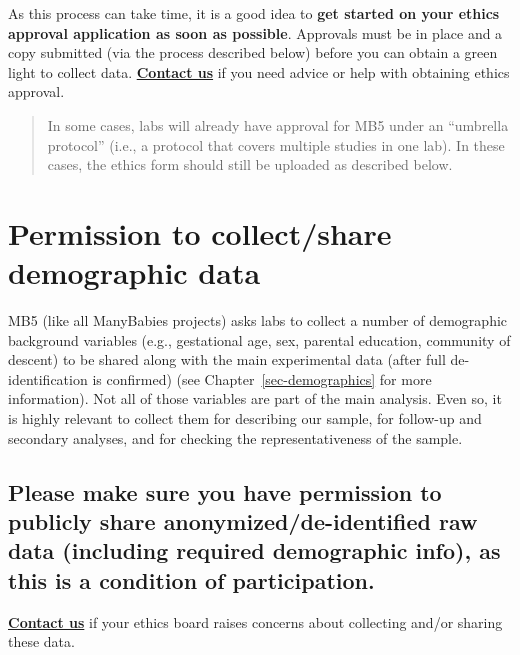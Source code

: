\documentclass[
  letterpaper,
  DIV=11,
  numbers=noendperiod,
  oneside]{scrreprt}
\begin{document}
As this process can take time, it is a good idea to \textbf{get started
on your ethics approval application as soon as possible}. Approvals must
be in place and a copy submitted (via the process described below)
before you can obtain a green light to collect data.
\href{mailto:mb5@manybabies.org}{\textbf{Contact us}} if you need advice
or help with obtaining ethics approval.

\begin{quote}
In some cases, labs will already have approval for MB5 under an
``umbrella protocol'' (i.e., a protocol that covers multiple studies in
one lab). In these cases, the ethics form should still be uploaded as
described below.
\end{quote}

\section{Permission to collect/share demographic
data}\label{permission-to-collectshare-demographic-data}

MB5 (like all ManyBabies projects) asks labs to collect a number of
demographic background variables (e.g., gestational age, sex, parental
education, community of descent) to be shared along with the main
experimental data (after full de-identification is confirmed) (see
Chapter~\ref{sec-demographics} for more information). Not all of those
variables are part of the main analysis. Even so, it is highly relevant
to collect them for describing our sample, for follow-up and secondary
analyses, and for checking the representativeness of the sample.

\subsection*{Please make sure you have permission to publicly share
anonymized/de-identified raw data (including required demographic info),
as this is a condition of
participation.}\label{please-make-sure-you-have-permission-to-publicly-share-anonymizedde-identified-raw-data-including-required-demographic-info-as-this-is-a-condition-of-participation.}

\href{mailto:mb5@manybabies.org}{\textbf{Contact us}} if your ethics
board raises concerns about collecting and/or sharing these data.
\end{document}
